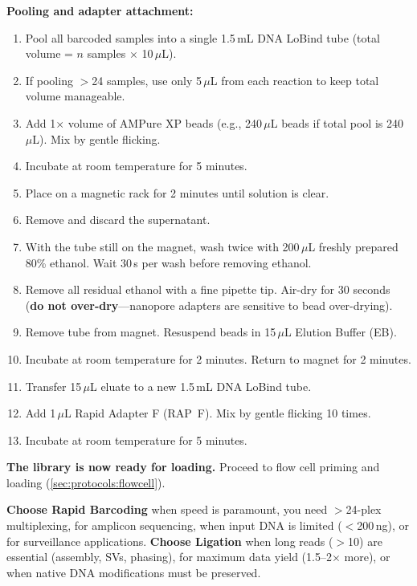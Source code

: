 \begin{protocolbox}[title={Protocol: Nanopore Rapid Barcoding (SQK-RBK114.96)}]
\textbf{Pooling and adapter attachment:}
\begin{enumerate}[nosep, start=6]
  \item Pool all barcoded samples into a single 1.5\,mL DNA LoBind tube (total volume = $n$ samples $\times$ 10\,$\mu$L).
  \item If pooling $>$24 samples, use only 5\,$\mu$L from each reaction to keep total volume manageable.
  \item Add 1$\times$ volume of AMPure XP beads (e.g., 240\,$\mu$L beads if total pool is 240\,$\mu$L). Mix by gentle flicking.
  \item Incubate at room temperature for 5 minutes.
  \item Place on a magnetic rack for 2 minutes until solution is clear.
  \item Remove and discard the supernatant.
  \item With the tube still on the magnet, wash twice with 200\,$\mu$L freshly prepared 80\% ethanol. Wait 30\,s per wash before removing ethanol.
  \item Remove all residual ethanol with a fine pipette tip. Air-dry for 30 seconds (\textbf{do not over-dry}---nanopore adapters are sensitive to bead over-drying).
  \item Remove tube from magnet. Resuspend beads in 15\,$\mu$L Elution Buffer (EB).
  \item Incubate at room temperature for 2 minutes. Return to magnet for 2 minutes.
  \item Transfer 15\,$\mu$L eluate to a new 1.5\,mL DNA LoBind tube.
  \item Add 1\,$\mu$L Rapid Adapter F (RAP~F). Mix by gentle flicking 10 times.
  \item Incubate at room temperature for 5 minutes.
\end{enumerate}

\textbf{The library is now ready for loading.} Proceed to flow cell priming and loading (\cref{sec:protocols:flowcell}).
\end{protocolbox}

\begin{tipbox}[title={When to Use Rapid Barcoding vs.\ Ligation}]
\textbf{Choose Rapid Barcoding} when speed is paramount, you need $>$24-plex multiplexing, for amplicon sequencing, when input DNA is limited ($<$200\,ng), or for surveillance applications.
\textbf{Choose Ligation} when long reads ($>$10\kilobase{}) are essential (assembly, SVs, phasing), for maximum data yield (1.5--2$\times$ more), or when native DNA modifications must be preserved.
\end{tipbox}

